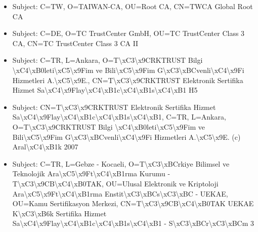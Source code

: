 \documentclass[xcolor={dvipsnames,svgnames},hyperref=dvips]{beamer}
\begin{document}
	\begin{frame}
		\begin{itemize}
		\item Subject: C=TW, O=TAIWAN-CA, OU=Root CA, CN=TWCA Global Root CA
		\item Subject: C=DE, O=TC TrustCenter GmbH, OU=TC TrustCenter Class 3 CA, CN=TC TrustCenter Class 3 CA II
		\item Subject: C=TR, L=Ankara, O=T\textbackslash xC3\textbackslash x9CRKTRUST Bilgi \textbackslash xC4\textbackslash xB0leti\textbackslash xC5\textbackslash x9Fim ve Bili\textbackslash xC5\textbackslash x9Fim G\textbackslash xC3\textbackslash xBCvenli\textbackslash xC4\textbackslash x9Fi Hizmetleri A.\textbackslash xC5\textbackslash x9E., CN=T\textbackslash xC3\textbackslash x9CRKTRUST Elektronik Sertifika Hizmet Sa\textbackslash xC4\textbackslash x9Flay\textbackslash xC4\textbackslash xB1c\textbackslash xC4\textbackslash xB1s\textbackslash xC4\textbackslash xB1 H5
		\item Subject: CN=T\textbackslash xC3\textbackslash x9CRKTRUST Elektronik Sertifika Hizmet Sa\textbackslash xC4\textbackslash x9Flay\textbackslash xC4\textbackslash xB1c\textbackslash xC4\textbackslash xB1s\textbackslash xC4\textbackslash xB1, C=TR, L=Ankara, O=T\textbackslash xC3\textbackslash x9CRKTRUST Bilgi \textbackslash xC4\textbackslash xB0leti\textbackslash xC5\textbackslash x9Fim ve Bili\textbackslash xC5\textbackslash x9Fim G\textbackslash xC3\textbackslash xBCvenli\textbackslash xC4\textbackslash x9Fi Hizmetleri A.\textbackslash xC5\textbackslash x9E. (c) Aral\textbackslash xC4\textbackslash xB1k 2007
		\item Subject: C=TR, L=Gebze - Kocaeli, O=T\textbackslash xC3\textbackslash xBCrkiye Bilimsel ve Teknolojik Ara\textbackslash xC5\textbackslash x9Ft\textbackslash xC4\textbackslash xB1rma Kurumu - T\textbackslash xC3\textbackslash x9CB\textbackslash xC4\textbackslash xB0TAK, OU=Ulusal Elektronik ve Kriptoloji Ara\textbackslash xC5\textbackslash x9Ft\textbackslash xC4\textbackslash xB1rma Enstit\textbackslash xC3\textbackslash xBCs\textbackslash xC3\textbackslash xBC - UEKAE, OU=Kamu Sertifikasyon Merkezi, CN=T\textbackslash xC3\textbackslash x9CB\textbackslash xC4\textbackslash xB0TAK UEKAE K\textbackslash xC3\textbackslash xB6k Sertifika Hizmet Sa\textbackslash xC4\textbackslash x9Flay\textbackslash xC4\textbackslash xB1c\textbackslash xC4\textbackslash xB1s\textbackslash xC4\textbackslash xB1 - S\textbackslash xC3\textbackslash xBCr\textbackslash xC3\textbackslash xBCm 3
		\end{itemize}
	\end{frame}
\end{document}
